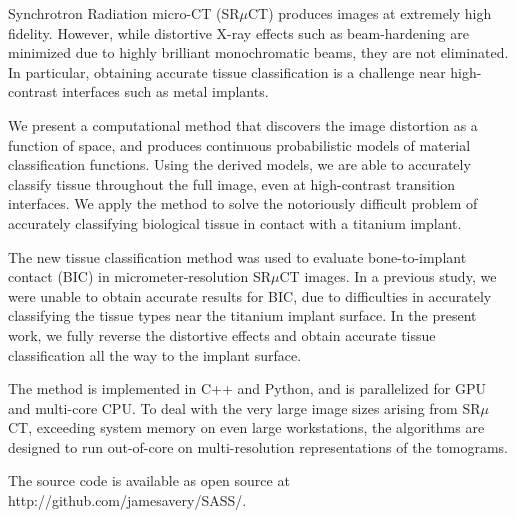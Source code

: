 Synchrotron Radiation micro-CT (SR$\mu$CT) produces images at
extremely high fidelity.  However, while distortive X-ray effects such
as beam-hardening are minimized due to highly brilliant monochromatic
beams, they are not eliminated. In particular, obtaining accurate
tissue classification is a challenge near high-contrast interfaces
such as metal implants.

We present a computational method that discovers the image distortion as a function of space,
and produces continuous probabilistic models of material classification functions.
Using the derived models, we are able to accurately classify tissue throughout the full
image, even at high-contrast transition interfaces.
% 
We apply the method to solve the notoriously difficult problem of accurately classifying
biological tissue in contact with a titanium implant. 
  
The new tissue classification method was used to evaluate
bone-to-implant contact (BIC) in micrometer-resolution SR$\mu$CT images.
In a previous study, we were unable to obtain accurate
results for BIC, due to difficulties in accurately classifying the
tissue types near the titanium implant surface. In the present work,
we fully reverse the distortive effects and obtain accurate tissue classification
all the way to the implant surface.

The method is implemented in C++ and Python, and is parallelized for GPU and multi-core CPU.
To deal with the very large image sizes arising from SR$\mu$CT, exceeding system
memory on even large workstations, the algorithms are designed to run
out-of-core on multi-resolution representations of the tomograms.

The source code is available as open source at http://github.com/jamesavery/SASS/.



